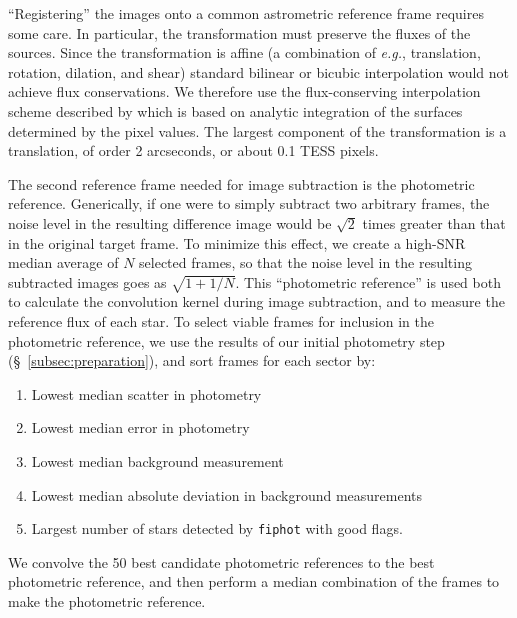 \documentclass[12pt,twocolumn,tighten]{aastex62}
\begin{document}
``Registering'' the images onto a common astrometric reference frame
requires some care. In particular, the transformation must preserve
the fluxes of the sources. Since the transformation is affine (a
combination of {\it e.g.}, translation, rotation, dilation, and shear)
standard bilinear or bicubic interpolation would not achieve flux
conservations.  We therefore use the flux-conserving interpolation
scheme described by \citet{Pal_2009} which is based on analytic
integration of the surfaces determined by the pixel values. 
The largest component of the transformation is a translation, of order
2 arcseconds, or about 0.1 TESS pixels.

The second reference frame needed for image subtraction is the
photometric reference.  Generically, if one were to simply subtract
two arbitrary frames, the noise level in the resulting difference
image would be $\sqrt{2}$ times greater than that in the original
target frame.
To minimize this effect, we create a high-SNR median average of
$N$ selected frames, so that the noise level in the resulting
subtracted images goes as $\sqrt{1+1/N}$.
This ``photometric reference'' is used both to calculate the
convolution kernel during image subtraction, and to measure the
reference flux of each star.
To select viable frames for inclusion in the photometric reference, we
use the results of our initial photometry step
(\S~\ref{subsec:preparation}), and sort frames for each sector by:
\begin{enumerate}
  \item Lowest median scatter in photometry
  \item Lowest median error in photometry
  \item Lowest median background measurement
  \item Lowest median absolute deviation in background measurements
  \item Largest number of stars detected by \texttt{fiphot} with good
    flags.
\end{enumerate}
We convolve the 50 best candidate photometric references to the best
photometric reference, and then perform a median combination of the
frames to make the photometric reference.

\end{document}
